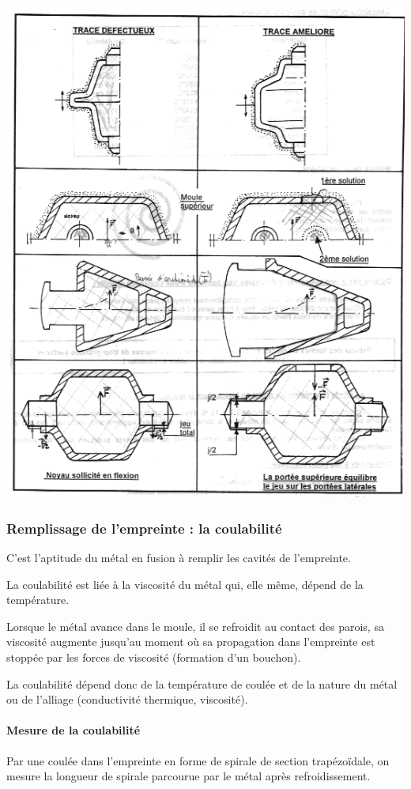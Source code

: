 \documentclass[11pt,oneside]{article}
\begin{document}
\begin{center}
 \includegraphics[width=.8\textwidth]{png/regles_physiques}
\end{center}
\subsubsection{Remplissage de l'empreinte : la coulabilité}
C'est l'aptitude du métal en fusion à remplir les cavités de l'empreinte. 

La coulabilité est liée à la viscosité du métal qui, elle même, dépend de la
température. 

Lorsque le métal avance dans le moule, il se refroidit au contact des parois,
sa viscosité augmente jusqu'au moment où sa propagation dans l'empreinte est
stoppée par les forces de viscosité (formation d'un bouchon). 

La coulabilité dépend donc de la température de coulée et de la nature du métal
ou de l'alliage (conductivité thermique, viscosité).

\paragraph*{Mesure de la coulabilité}
Par une coulée dans l'empreinte en forme de spirale de section trapézoïdale, on
mesure la longueur de spirale parcourue par le métal après refroidissement. 
\end{document}

